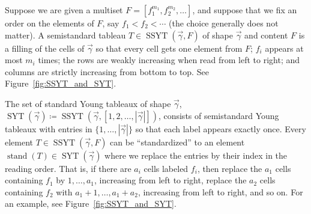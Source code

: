 \documentclass[a4paper,12pt]{amsart}
\theoremstyle{plain}
\theoremstyle{definition}
\theoremstyle{remark}
\DeclareMathOperator{\SSYT}{SSYT}
\DeclareMathOperator{\stand}{stand}
\DeclareMathOperator{\SYT}{SYT}
\begin{document}
Suppose we are given a multiset $F=[f_1^{m_1}, f_2^{m_2},\dots]$, and suppose that we fix an order on the elements of $F$, say $f_1<f_2<\cdots$ (the choice generally does not matter). A semistandard tableau $T\in \SSYT(\vec{\gamma},F)$ of shape $\vec{\gamma}$ and content $F$ is a filling of the cells of $\vec{\gamma}$ so that every cell gets one element from $F$; $f_i$ appears at most $m_i$ times; the rows are weakly increasing when read from left to right; and columns are strictly increasing from bottom to top. See Figure~\ref{fig:SSYT_and_SYT}.

The set of standard Young tableaux of shape $\vec{\gamma}$, $\SYT(\vec{\gamma}) \coloneq \SSYT(\vec{\gamma},[1,2,\dots,|\vec{\gamma}|])$, consists of semistandard Young tableaux with entries in $\{1,\dots, |\vec{\gamma}|\}$ so that each label appears exactly once. 
Every element $T \in \SSYT(\vec{\gamma},F)$ can be ``standardized'' to an element $\stand(T) \in \SYT(\vec{\gamma})$ where we replace the entries by their index in the reading order. That is, if there are $a_i$ cells labeled $f_i$, then replace the $a_1$ cells containing $f_1$ by $1,\dots, a_1$, increasing from left to right, replace the $a_2$ cells containing $f_2$ with $a_1+1,\dots, a_1+a_2$, increasing from left to right, and so on. For an example, see Figure~\ref{fig:SSYT_and_SYT}.
\end{document}
